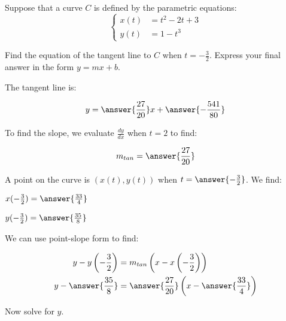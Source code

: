 \documentclass{ximera}
\author{Alex Beckwith}
\begin{document}
\begin{exercise}
Suppose that a curve $C$ is defined by the parametric equations:
\[
\begin{cases}
x(t) &= t^2-2t+3 \\
y(t) &= 1-t^3
\end{cases}
\]

Find the equation of the tangent line to $C$ when $t = -\frac{3}{2}$.  Express your final answer in the form $y=mx+b$.

The tangent line is:

\[
y = \answer{\frac{27}{20}}x+\answer{-\frac{541}{80}}
\]

\begin{hint}
To find the slope, we evaluate $\frac{dy}{dx}$ when $t=2$ to find:

\[
m_{tan} = \answer{\frac{27}{20}}
\]

A point on the curve is $(x(t),y(t))$ when $t=\answer{-\frac{3}{2}}$.  We find:

$x(-\frac{3}{2}) = \answer{\frac{33}{4}}$

$y(-\frac{3}{2}) = \answer{\frac{35}{8}}$

We can use point-slope form to find:

\begin{align*}
y-y\left(-\frac{3}{2}\right) &= m_{tan}\left(x-x\left(-\frac{3}{2}\right)\right) \\
y- \answer{\frac{35}{8}} &= \answer{\frac{27}{20}} \left( x-\answer{\frac{33}{4}} \right)
\end{align*}

Now solve for $y$.

\end{hint}

\end{exercise}
\end{document}
